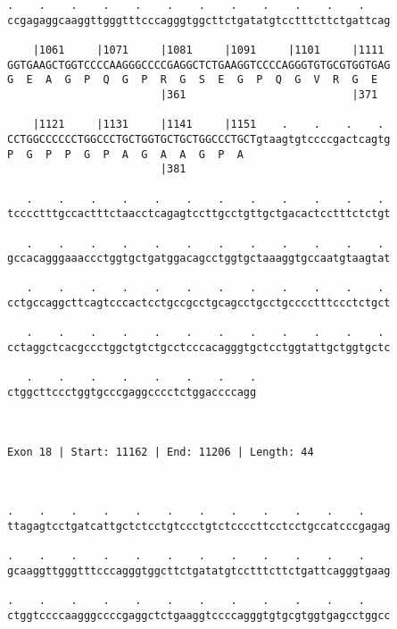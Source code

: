 \documentclass{article}
\begin{document}
\begin{Verbatim}
.    .    .    .    .    .    .    .    .    .    .    .    
ccgagaggcaaggttgggtttcccagggtggcttctgatatgtcctttcttctgattcag
                                                            
    |1061     |1071     |1081     |1091     |1101     |1111 
GGTGAAGCTGGTCCCCAAGGGCCCCGAGGCTCTGAAGGTCCCCAGGGTGTGCGTGGTGAG
G  E  A  G  P  Q  G  P  R  G  S  E  G  P  Q  G  V  R  G  E  
                        |361                          |371  
  
    |1121     |1131     |1141     |1151    .    .    .    . 
CCTGGCCCCCCTGGCCCTGCTGGTGCTGCTGGCCCTGCTgtaagtgtccccgactcagtg
P  G  P  P  G  P  A  G  A  A  G  P  A                       
                        |381                                
  
   .    .    .    .    .    .    .    .    .    .    .    . 
tcccctttgccactttctaacctcagagtccttgcctgttgctgacactcctttctctgt
                                                            
   .    .    .    .    .    .    .    .    .    .    .    . 
gccacagggaaaccctggtgctgatggacagcctggtgctaaaggtgccaatgtaagtat
                                                            
   .    .    .    .    .    .    .    .    .    .    .    . 
cctgccaggcttcagtcccactcctgccgcctgcagcctgcctgcccctttccctctgct
                                                            
   .    .    .    .    .    .    .    .    .    .    .    . 
cctaggctcacgccctggctgtctgcctcccacagggtgctcctggtattgctggtgctc
                                                            
   .    .    .    .    .    .    .    .
ctggcttccctggtgcccgaggcccctctggaccccagg
                                       
                                       
 
Exon 18 | Start: 11162 | End: 11206 | Length: 44



.    .    .    .    .    .    .    .    .    .    .    .    
ttagagtcctgatcattgctctcctgtccctgtctccccttcctcctgccatcccgagag
                                                            
.    .    .    .    .    .    .    .    .    .    .    .    
gcaaggttgggtttcccagggtggcttctgatatgtcctttcttctgattcagggtgaag
                                                            
.    .    .    .    .    .    .    .    .    .    .    .    
ctggtccccaagggccccgaggctctgaaggtccccagggtgtgcgtggtgagcctggcc
                                                            

\end{Verbatim}
\end{document}
